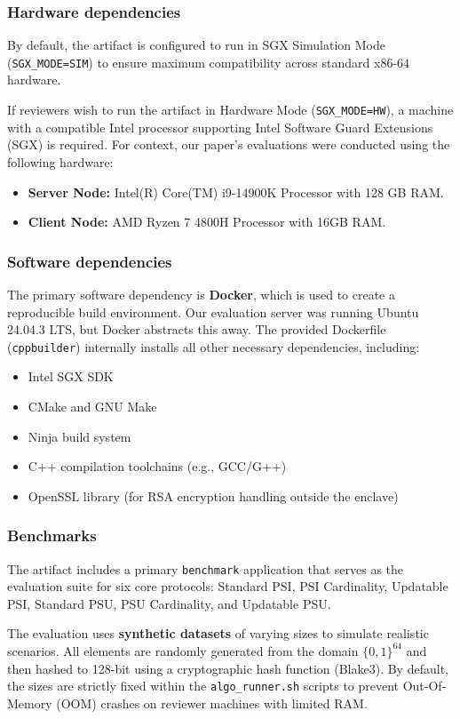 \documentclass[conference]{IEEEtran}
\begin{document}
\subsubsection{Hardware dependencies}
By default, the artifact is configured to run in SGX Simulation Mode (\texttt{SGX\_MODE=SIM}) to ensure maximum compatibility across standard x86-64 hardware. 

If reviewers wish to run the artifact in Hardware Mode (\texttt{SGX\_MODE=HW}), a machine with a compatible Intel processor supporting Intel Software Guard Extensions (SGX) is required. For context, our paper's evaluations were conducted using the following hardware:
\begin{itemize}
    \item \textbf{Server Node:} Intel(R) Core(TM) i9-14900K Processor with 128 GB RAM.
    \item \textbf{Client Node:} AMD Ryzen 7 4800H Processor with 16GB RAM.
\end{itemize}

\subsubsection{Software dependencies}
The primary software dependency is \textbf{Docker}, which is used to create a reproducible build environment. Our evaluation server was running Ubuntu 24.04.3 LTS, but Docker abstracts this away. The provided Dockerfile (\texttt{cppbuilder}) internally installs all other necessary dependencies, including:
\begin{itemize}
    \item Intel SGX SDK
    \item CMake and GNU Make
    \item Ninja build system
    \item C++ compilation toolchains (e.g., GCC/G++)
    \item OpenSSL library (for RSA encryption handling outside the enclave)
\end{itemize}

\subsubsection{Benchmarks}
The artifact includes a primary \texttt{benchmark} application that serves as the evaluation suite for six core protocols: Standard PSI, PSI Cardinality, Updatable PSI, Standard PSU, PSU Cardinality, and Updatable PSU. 

The evaluation uses \textbf{synthetic datasets} of varying sizes to simulate realistic scenarios. All elements are randomly generated from the domain $\{0, 1\}^{64}$ and then hashed to 128-bit using a cryptographic hash function (Blake3). By default, the sizes are strictly fixed within the \texttt{algo\_runner.sh} scripts to prevent Out-Of-Memory (OOM) crashes on reviewer machines with limited RAM.
\end{document}
